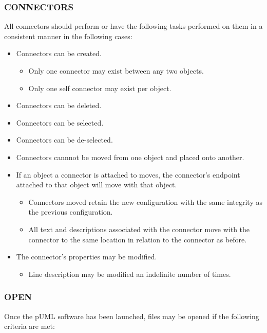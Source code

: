 \documentclass[twoside,letterpaper]{article}
\begin{document}
{\bigskip

\subsubsection[CONNECTORS]{\bfseries CONNECTORS}

All connectors should perform or have the following tasks performed on them in a consistent manner in the following cases: 
\begin{itemize}
\item Connectors can be created.
\begin{itemize}
\item Only one connector may exist between any two objects.
\item Only one self connector may exist per object.
\end{itemize}
\item Connectors can be deleted.
\item Connectors can be selected.
\item Connectors can be de-selected.
\item Connectors cannnot be moved from one object and placed onto another. 
\item If an object a connector is attached to moves, the connector's endpoint attached to that object will move with that object. 
\begin{itemize}
\item Connectors moved retain the new configuration with the same integrity as the previous configuration.
\item All text and descriptions associated with the connector move with the connector to the same location in relation to the connector as before.
\end{itemize}
\item The connector's properties may be modified.
\begin{itemize}
\item Line description may be modified an indefinite number of times.
\end{itemize}
\end{itemize}

\bigskip

\subsubsection[OPEN]{\bfseries OPEN}

Once the pUML software has been launched, files may be opened if the following criteria are met:

}
\end{document}
